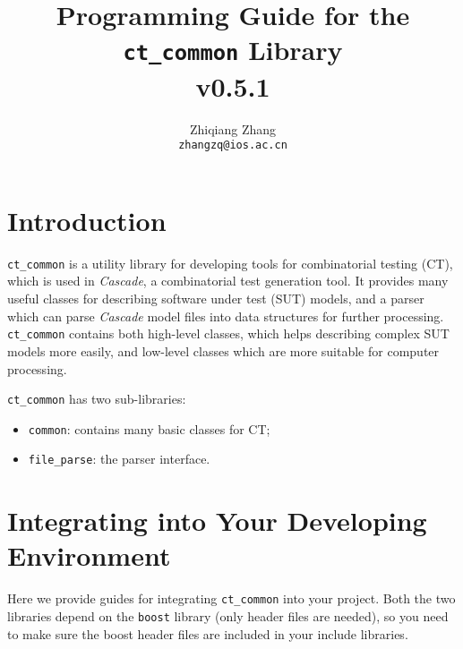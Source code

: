 \documentclass{article}
\begin{document}
\title{Programming Guide for the {\tt ct\_common} Library\\v0.5.1}
\author{Zhiqiang Zhang\\{\tt zhangzq@ios.ac.cn}}
\date{}
\maketitle
\tableofcontents
\section{Introduction}
{\tt ct\_common} is a utility library for developing tools for combinatorial testing (CT),
which is used in \emph{Cascade}, a combinatorial test generation tool.
It provides many useful classes for describing software under test (SUT) models,
and a parser which can parse \emph{Cascade} model files into data structures for
further processing. {\tt ct\_common} contains both high-level classes, which helps
describing complex SUT models more easily, and low-level classes which are more suitable
for computer processing.

{\tt ct\_common} has two sub-libraries:
\begin{itemize}
\item {\tt common}: contains many basic classes for CT;
\item {\tt file\_parse}: the parser interface.
\end{itemize}

\section{Integrating into Your Developing \mbox{Environment}}
Here we provide guides for integrating {\tt ct\_common} into your project.
Both the two libraries depend on the {\tt boost} library (only header files are needed),
so you need to make sure the boost header files are included in your include libraries.
\end{document}
